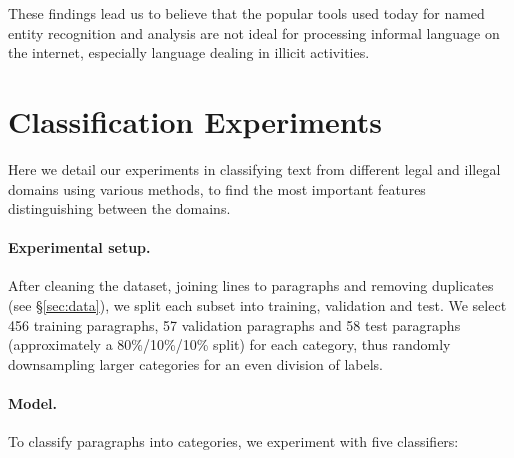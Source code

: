 \documentclass[11pt,a4paper,table]{article}
\begin{document}
These findings lead us to believe that the popular tools used today
for named entity recognition and analysis are not ideal for processing
informal language on the internet, especially language dealing in
illicit activities. 

\section{Classification Experiments}

Here we detail our experiments in classifying text from different legal and
illegal domains using various methods, to find the most important features
distinguishing between the domains.

\paragraph{Experimental setup.}

After cleaning the dataset, joining lines to paragraphs and removing duplicates
(see \S\ref{sec:data}), we split each subset into training, validation and test.
We select 456 training paragraphs, 57 validation paragraphs and
58 test paragraphs (approximately a 80\%/10\%/10\% split) for each category,
thus randomly downsampling larger categories for an even division of labels.

\paragraph{Model.}

To classify paragraphs into categories, we experiment with five classifiers:
\end{document}
